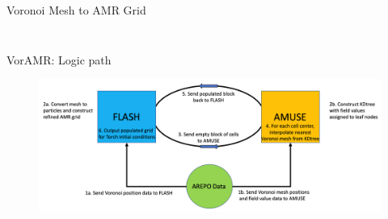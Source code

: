 \documentclass[aspectratio=169]{beamer}
\begin{document}
\begin{frame}{Voronoi Mesh to AMR Grid}
\begin{columns}
\begin{column}{0.44\textwidth}
\begin{figure}[h!]
                \label{fig:amr_example}
            \end{figure}
        \end{column}
    \end{columns}
\end{frame} 
%
%
%
%
%
%
%
%
%
%
\begin{frame}{VorAMR: Logic path}
	\begin{figure}[h!]
                \centering
                \includegraphics[width=\linewidth]{../images/voramr_logic.png} \\
                \label{fig:voramr_logic}
	\end{figure}
\end{frame}
%
%
%
%
%
\end{document}

